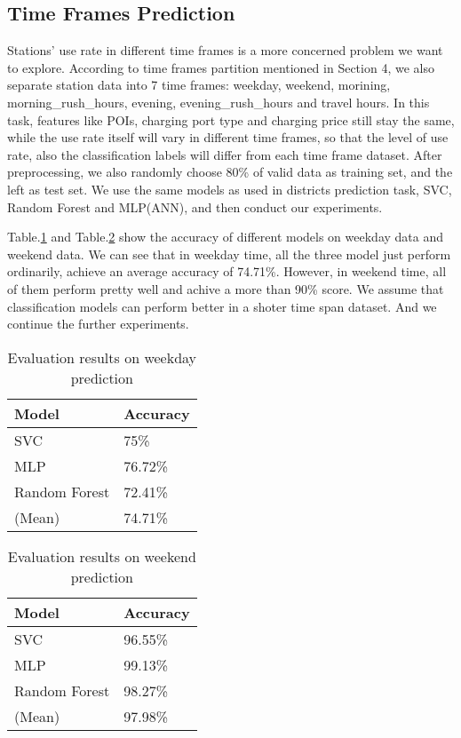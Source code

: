 \subsection{Time Frames Prediction}
Stations' use rate in different time frames is a more concerned problem we want to explore. According to time frames partition mentioned in Section 4, we also separate station data into 7 time frames: weekday, weekend, morining, morning\_rush\_hours, evening, evening\_rush\_hours and travel hours. In this task, features like POIs, charging port type and charging price still stay the same, while the use rate itself will vary in different time frames, so that the level of use rate, also the classification labels will differ from each time frame dataset. After preprocessing, we also randomly choose 80\% of valid data as training set, and the left as test set. We use the same models as used in districts prediction task, SVC, Random Forest and MLP(ANN), and then conduct our experiments.

Table.\ref{tab4} and Table.\ref{tab5} show the accuracy of different models on weekday data and weekend data. We can see that in weekday time, all the three model just perform ordinarily, achieve an average accuracy of 74.71\%. However, in weekend time, all of them perform pretty well and achive a more than 90\% score. We assume that classification models can perform better in a shoter time span dataset. And we continue the further experiments.
\begin{table}[htbp]
	\caption{Evaluation results on weekday prediction}
	\begin{center}
		\begin{tabular}{|l|l|}
			\hline
			Model & Accuracy\\
			\hline
			SVC & 75\%\\
			\hline
			MLP & 76.72\%\\
			\hline
			Random Forest & 72.41\%\\
			\hline
			(Mean) & 74.71\%\\
			\hline
		\end{tabular}
		\label{tab4}
	\end{center}
\end{table}

\begin{table}[htbp]
	\caption{Evaluation results on weekend prediction}
	\begin{center}
		\begin{tabular}{|l|l|}
			\hline
			Model & Accuracy\\
			\hline
			SVC & 96.55\%\\
			\hline
			MLP & 99.13\%\\
			\hline
			Random Forest & 98.27\%\\
			\hline
			(Mean) & 97.98\%\\
			\hline
		\end{tabular}
		\label{tab5}
	\end{center}
\end{table}

